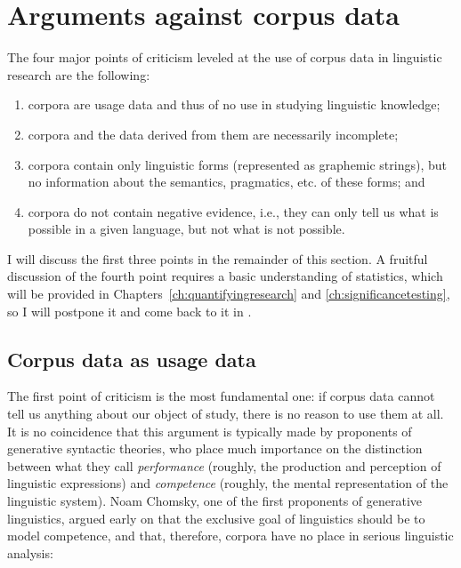 \section{Arguments against corpus data}
\label{sec:argumentsagainstcorpusdata}

The four major points of criticism leveled at the use of corpus data in linguistic research are the following:

\begin{enumerate}
\item corpora are usage data and thus of no use in studying linguistic knowledge;
\item corpora and the data derived from them are necessarily incomplete;
\item corpora contain only linguistic forms (represented as graphemic strings), but no information about the semantics,  pragmatics,  etc. of these forms; and
\item corpora do not contain negative evidence,  i.e., they can only tell us what is possible in a given language, but not what is not possible.
\end{enumerate}

I will discuss the first three points in the remainder of this section. A fruitful discussion of the fourth point requires a basic understanding of statistics,  which will be provided in Chapters~\ref{ch:quantifyingresearch} and \ref{ch:significancetesting}, so I will postpone it and come back to it in .

\subsection{Corpus data as usage data}
\label{sec:corpusdataasusagedata}

The first point of criticism is the most fundamental one: if corpus data cannot tell us anything about our object of study, there is no reason to use them at all. It is no coincidence that this argument is typically made by proponents of generative  syntactic  theories, who place much importance on the distinction between what they call \textit{performance}  (roughly, the production and perception of linguistic expressions) and \textit{competence}  (roughly, the mental representation of the linguistic system). Noam Chomsky, one of the first proponents of generative  linguistics, argued early on that the exclusive goal of linguistics should be to model competence, and that, therefore, corpora have no place in serious linguistic analysis:

